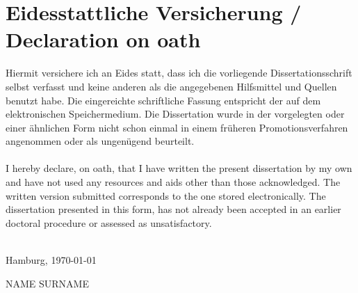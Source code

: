  
 
\vfill\vspace{-2cm}\par
\thispagestyle{empty}
\cleardoublepage

\thispagestyle{empty}
\section*{Eidesstattliche Versicherung / Declaration on oath}
\vspace{1cm}
\begin{center}
    
\parbox[b]{0.85\textwidth}{
  
Hiermit versichere ich an Eides statt, dass ich die vorliegende Dissertations\-schrift selbst verfasst und keine anderen als die angegebenen Hilfsmittel und Quellen benutzt habe. 
Die eingereichte schriftliche Fassung entspricht der auf dem elektronischen Speichermedium. 
Die Dissertation wurde in der vorgelegten oder einer ähnlichen Form nicht schon einmal in einem früheren Promotionsverfahren
angenommen oder als ungenügend beurteilt.\\\\

I hereby declare, on oath, that I have written the present dissertation by my own and have not used any resources and aids other than those acknowledged.
The written version submitted corresponds to the one stored  electronically.
The dissertation presented in this form, has not already been accepted in an earlier doctoral procedure or assessed as unsatisfactory.\\\\
\vspace{1cm}

\hspace{0.2cm} Hamburg, \today \hfill 
\vspace{0.5cm}

\hfill NAME SURNAME \hspace{1.0cm} 
}

\end{center}
\vfill
\newpage
\thispagestyle{empty}
\cleardoublepage


